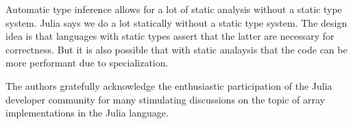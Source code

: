 \documentclass[preprint]{sigplanconf}
\begin{document}
Automatic type inference allows for a lot of static analysis without a static
type system. Julia says we do a lot statically without a static type system.
The design idea is that languages with static types assert that the latter are
necessary for correctness. But it is also possible that with static analaysis
that the code can be more performant due to specialization.

%

\acks

The authors gratefully acknowledge the enthusiastic participation of the Julia
developer community for many stimulating discussions on the topic of array
implementations in the Julia language.



{}





\end{document}
